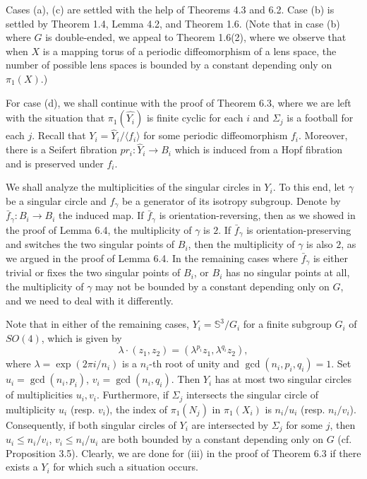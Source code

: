 \documentclass[11pt]{amsart}
\theoremstyle{plain}
\numberwithin{theorem}{section}
\theoremstyle{definition}
\begin{document}
Cases (a), (c) are settled with the help of Theorems 4.3 and 6.2. Case (b) is settled by
Theorem 1.4, Lemma 4.2, and Theorem 1.6. (Note that in case (b) where $G$ is double-ended, 
we appeal to Theorem 1.6(2), where we observe that when $X$ is a mapping torus of a periodic 
diffeomorphism of a lens space, the number of possible lens spaces is bounded by a constant depending only on $\pi_1(X)$.)

For case (d), we shall continue with the proof of Theorem 6.3, where we are left with the 
situation that $\pi_1(\hat{Y_i})$ is finite cyclic for each $i$ and $\Sigma_j$ is a football for 
each $j$. Recall that $Y_i=\hat{Y}_i/\langle f_i\rangle$ for some periodic diffeomorphism 
$f_i$. Moreover, there is a Seifert fibration $pr_i: \hat{Y}_i\rightarrow B_i$ which is induced 
from a Hopf fibration and is preserved under $f_i$. 

We shall analyze the multiplicities of the singular circles in $Y_i$. To this end, let $\gamma$
be a singular circle and $f_\gamma$ be a generator of its isotropy subgroup. Denote by
$\bar{f}_\gamma: B_i\rightarrow B_i$ the induced map. If $\bar{f}_\gamma$ is orientation-reversing,
then as we showed in the proof of Lemma 6.4, the multiplicity of $\gamma$ is $2$. If
$\bar{f}_\gamma$ is orientation-preserving and switches the two singular points of $B_i$,
then the multiplicity of $\gamma$ is also $2$, as we argued in the proof of Lemma 6.4.
In the remaining cases where $\bar{f}_\gamma$ is either trivial or fixes the two singular points 
of $B_i$, or $B_i$ has no singular points at all, the multiplicity of $\gamma$ may not be bounded 
by a constant depending only on $G$, and we need to deal with it differently. 

Note that in either of the remaining cases, $Y_i={{\mathbb S}}^3/G_i$ for a finite subgroup $G_i$ 
of $SO(4)$, which is given by
$$
\lambda \cdot (z_1,z_2)=(\lambda^{p_i}z_1,\lambda^{q_i}z_2), 
$$
where $\lambda=\exp(2\pi i/n_i)$ is a $n_i$-th root of unity and $\gcd(n_i,p_i,q_i)=1$. 
Set $u_i=\gcd(n_i,p_i)$, $v_i=\gcd(n_i,q_i)$. Then $Y_i$ has at most two singular circles 
of multiplicities $u_i,v_i$. Furthermore, if $\Sigma_j$ intersects the singular circle of 
multiplicity $u_i$ (resp. $v_i$), the index of $\pi_1(N_j)$ in $\pi_1(X_i)$ is $n_i/u_i$ 
(resp. $n_i/v_i$). Consequently, if both singular circles of $Y_i$ are intersected by $\Sigma_j$ 
for some $j$, then $u_i\leq n_i/v_i$, $v_i\leq  n_i/u_i$ are both bounded by a constant depending 
only on $G$ (cf. Proposition 3.5). Clearly, we are done for (iii) in the proof of Theorem 6.3 
if there exists a $Y_i$ for which such a situation occurs. 
\end{document}
